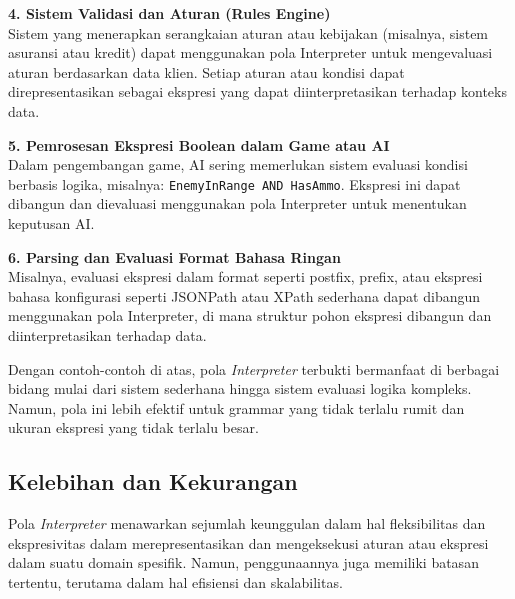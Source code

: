 \textbf{4. Sistem Validasi dan Aturan (Rules Engine)} \\
Sistem yang menerapkan serangkaian aturan atau kebijakan (misalnya, sistem asuransi atau kredit) dapat menggunakan pola Interpreter untuk mengevaluasi aturan berdasarkan data klien. Setiap aturan atau kondisi dapat direpresentasikan sebagai ekspresi yang dapat diinterpretasikan terhadap konteks data.

\textbf{5. Pemrosesan Ekspresi Boolean dalam Game atau AI} \\
Dalam pengembangan game, AI sering memerlukan sistem evaluasi kondisi berbasis logika, misalnya: \texttt{EnemyInRange AND HasAmmo}. Ekspresi ini dapat dibangun dan dievaluasi menggunakan pola Interpreter untuk menentukan keputusan AI.

\textbf{6. Parsing dan Evaluasi Format Bahasa Ringan} \\
Misalnya, evaluasi ekspresi dalam format seperti postfix, prefix, atau ekspresi bahasa konfigurasi seperti JSONPath atau XPath sederhana dapat dibangun menggunakan pola Interpreter, di mana struktur pohon ekspresi dibangun dan diinterpretasikan terhadap data.

Dengan contoh-contoh di atas, pola \textit{Interpreter} terbukti bermanfaat di berbagai bidang mulai dari sistem sederhana hingga sistem evaluasi logika kompleks. Namun, pola ini lebih efektif untuk grammar yang tidak terlalu rumit dan ukuran ekspresi yang tidak terlalu besar.


\subsection{Kelebihan dan Kekurangan}

Pola \textit{Interpreter} menawarkan sejumlah keunggulan dalam hal fleksibilitas dan ekspresivitas dalam merepresentasikan dan mengeksekusi aturan atau ekspresi dalam suatu domain spesifik. Namun, penggunaannya juga memiliki batasan tertentu, terutama dalam hal efisiensi dan skalabilitas.

